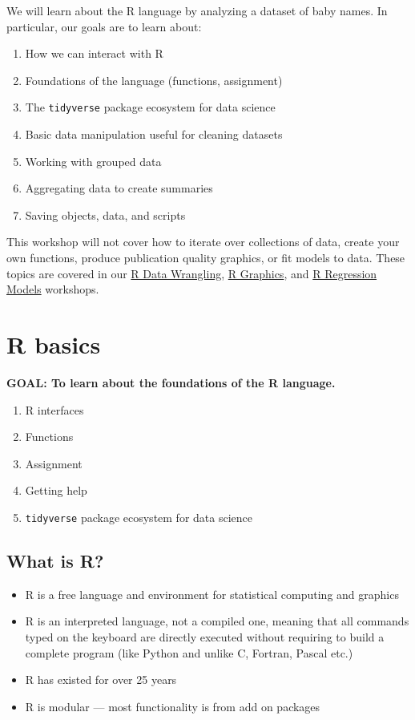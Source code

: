 \documentclass[
]{book}
\providecommand{\tightlist}{%
  \setlength{\itemsep}{0pt}\setlength{\parskip}{0pt}}
\begin{document}
We will learn about the R language by analyzing a dataset of baby names.
In particular, our goals are to learn about:

\begin{enumerate}
\def\labelenumi{\arabic{enumi}.}
\tightlist
\item
  How we can interact with R
\item
  Foundations of the language (functions, assignment)
\item
  The \texttt{tidyverse} package ecosystem for data science
\item
  Basic data manipulation useful for cleaning datasets
\item
  Working with grouped data
\item
  Aggregating data to create summaries
\item
  Saving objects, data, and scripts
\end{enumerate}

This workshop will not cover how to iterate over collections of data, create
your own functions, produce publication quality graphics, or fit models to data.
These topics are covered in our \href{./RDataWrangling.html}{R Data Wrangling},
\href{./Rgraphics.html}{R Graphics}, and \href{./Rmodels.html}{R Regression Models} workshops.

\hypertarget{r-basics}{%
\section{R basics}\label{r-basics}}

\textbf{GOAL: To learn about the foundations of the R language.}

\begin{enumerate}
\def\labelenumi{\arabic{enumi}.}
\tightlist
\item
  R interfaces
\item
  Functions
\item
  Assignment
\item
  Getting help
\item
  \texttt{tidyverse} package ecosystem for data science
\end{enumerate}

\hypertarget{what-is-r}{%
\subsection{What is R?}\label{what-is-r}}

\begin{itemize}
\tightlist
\item
  R is a free language and environment for statistical computing and graphics
\item
  R is an interpreted language, not a compiled one, meaning that all commands
  typed on the keyboard are directly executed without requiring to build a complete
  program (like Python and unlike C, Fortran, Pascal etc.)
\item
  R has existed for over 25 years
\item
  R is modular --- most functionality is from add on packages
\end{itemize}
\end{document}
